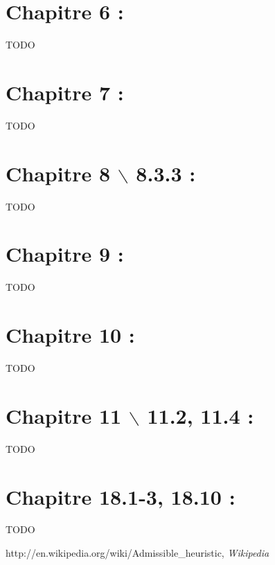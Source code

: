 \section{Chapitre 6 : }
TODO

\section{Chapitre 7 : }
TODO

\section{Chapitre 8 $\backslash$ 8.3.3 : }
TODO

\section{Chapitre 9 : }
TODO

\section{Chapitre 10 : }
TODO

\section{Chapitre 11 $\backslash$ 11.2, 11.4 : }
TODO

\section{Chapitre 18.1-3, 18.10 : }
TODO


\begin{thebibliography}{1}
 http://en.wikipedia.org/wiki/Admissible\_heuristic, {\em Wikipedia}
\end{thebibliography}


